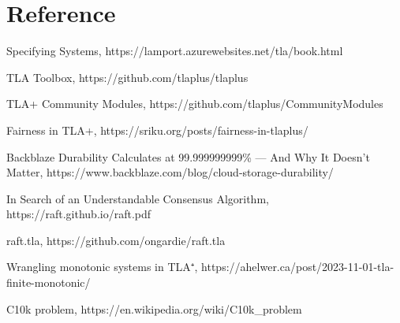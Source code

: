 \chapter{Reference}

\begin{thebibliography}{9}

Specifying Systems, 
https://lamport.azurewebsites.net/tla/book.html

TLA Toolbox,
https://github.com/tlaplus/tlaplus

TLA+ Community Modules,
https://github.com/tlaplus/CommunityModules

\bibitem{}
Fairness in TLA+,
https://sriku.org/posts/fairness-in-tlaplus/

Backblaze Durability Calculates at 99.999999999\% — And Why It Doesn’t Matter,
https://www.backblaze.com/blog/cloud-storage-durability/

In Search of an Understandable Consensus Algorithm,
https://raft.github.io/raft.pdf

raft.tla,
https://github.com/ongardie/raft.tla

Wrangling monotonic systems in TLA⁺,
https://ahelwer.ca/post/2023-11-01-tla-finite-monotonic/

C10k problem,
https://en.wikipedia.org/wiki/C10k\_problem

\end{thebibliography}

